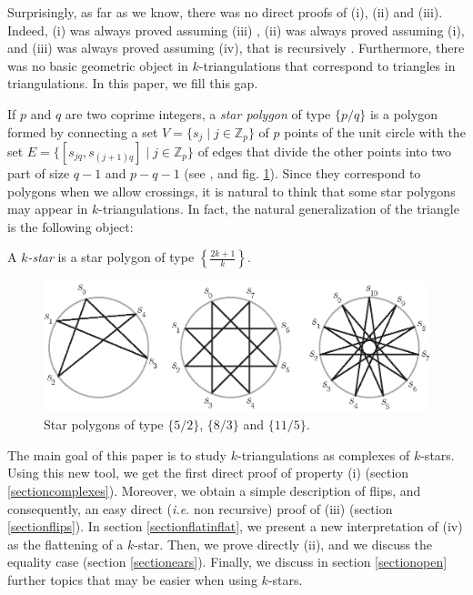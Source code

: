 \documentclass[12pt]{amsart}
\begin{document}
Surprisingly, as far as we know, there was no direct proofs of (i), (ii) and (iii). Indeed, (i) was always proved assuming (iii) \cite{n-gdfcp-00,dkm-lahp-02}, (ii) was always proved assuming (i), and (iii) was always proved assuming (iv), that is recursively \cite{n-gdfcp-00,j-gt-03}. Furthermore, there was no basic geometric object in $k$-triangulations that correspond to triangles in triangulations. In this paper, we fill this gap.

If $p$ and $q$ are two coprime integers, a \emph{star polygon} of type $\{p/q\}$ is a polygon formed by connecting a set $V=\{s_j\;|\; j\in\mathbb{Z}_p\}$ of $p$ points of the unit circle with the set $E=\{[s_{jq},s_{(j+1)q}] \;|\; j\in\mathbb{Z}_p\}$ of edges that divide the other points into two part of size $q-1$ and $p-q-1$ (see \cite[ pp. 93-95]{c-rp-73}, \cite[pp. 36-38]{c-ig-73} and fig. \ref{starpolygons}). Since they correspond to polygons when we allow crossings, it is natural to think that some star polygons may appear in $k$-triangulations. In fact, the natural generalization of the triangle is the following object:

\begin{definition}
A \emph{$k$-star} is a star polygon of type $\left\{\frac{2k+1}{k}\right\}$.
\end{definition}

\begin{figure}
\centerline{\includegraphics[scale=1]{starpolygons.eps}}
\caption{\small{Star polygons of type $\{5/2\}$, $\{8/3\}$ and $\{11/5\}$.}}\label{starpolygons}
\end{figure}

The main goal of this paper is to study $k$-triangulations as complexes of $k$-stars. Using this new tool, we get the first direct proof of property (i) (section \ref{sectioncomplexes}). Moreover, we obtain a simple description of flips, and consequently, an easy direct ({\it i.e.} non recursive) proof of (iii) (section \ref{sectionflips}). In section \ref{sectionflatinflat}, we present a new interpretation of (iv) as the flattening of a $k$-star. Then, we prove directly (ii), and we discuss the equality case (section \ref{sectionears}).
Finally, we discuss in section \ref{sectionopen} further topics that may be easier when using $k$-stars.
\end{document}
